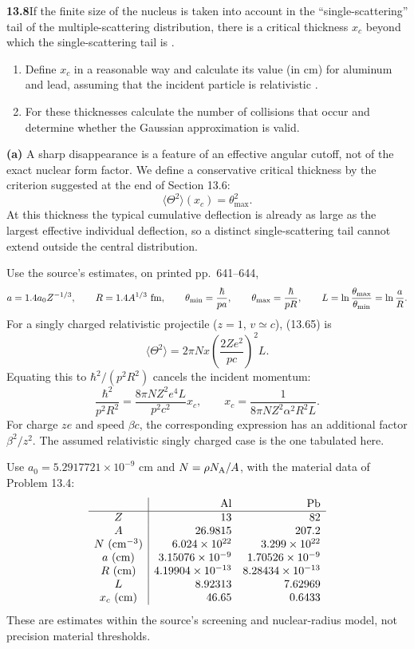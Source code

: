 \par\bigskip
\noindent\textbf{13.8}\quad If the finite size of the nucleus is taken into account in the ``single-scattering'' tail of the multiple-scattering distribution, there is a critical thickness $x_{c}$ beyond which the single-scattering tail is .
\begin{enumerate}
\item[(a)] Define $x_{c}$ in a reasonable way and calculate its value (in cm) for aluminum and lead, assuming that the incident particle is relativistic .
\item[(b)] For these thicknesses calculate the number of collisions that occur and determine whether the Gaussian approximation is valid.
\end{enumerate}
\solution
\textbf{(a)} A sharp disappearance is a feature of an effective
angular cutoff, not of the exact nuclear form factor. We define a
conservative critical thickness by the criterion suggested at the end
of Section 13.6:
\[
 \boxed{\langle\Theta^2\rangle(x_c)=\theta_{\max}^2.}
\]
At this thickness the typical cumulative deflection is already as large
as the largest effective individual deflection, so a distinct
single-scattering tail cannot extend outside the central distribution.

Use the source's estimates, on printed pp.~641--644,
\[
 a=1.4a_0Z^{-1/3},\qquad R=1.4A^{1/3}\ {\rm fm},\qquad
 \theta_{\min}=\frac{\hbar}{pa},\qquad
 \theta_{\max}=\frac{\hbar}{pR},\qquad
 L=\ln\frac{\theta_{\max}}{\theta_{\min}}=\ln\frac aR.
\]
For a singly charged relativistic projectile ($z=1$, $v\simeq c$),
(13.65) is
\[
 \langle\Theta^2\rangle
 =2\pi Nx\left(\frac{2Ze^2}{pc}\right)^2L.
\]
Equating this to $\hbar^2/(p^2R^2)$ cancels the incident momentum:
\[
 \frac{\hbar^2}{p^2R^2}
 =\frac{8\pi NZ^2e^4L}{p^2c^2}x_c,
 \qquad
 \boxed{x_c=\frac{1}{8\pi NZ^2\alpha^2R^2L}.}
\]
For charge $ze$ and speed $\beta c$, the corresponding expression has
an additional factor $\beta^2/z^2$. The assumed relativistic singly
charged case is the one tabulated here.

Use $a_0=5.2917721\times10^{-9}$ cm and
$N=\rho N_{\rm A}/A$, with the material data of Problem 13.4:
\[
\begin{array}{c|rr}
 &\text{Al}&\text{Pb}\\ \hline
 Z&13&82\\
 A&26.9815&207.2\\
 N\ ({\rm cm^{-3}})&6.024\times10^{22}&3.299\times10^{22}\\
 a\ ({\rm cm})&3.15076\times10^{-9}&1.70526\times10^{-9}\\
 R\ ({\rm cm})&4.19904\times10^{-13}&8.28434\times10^{-13}\\
 L&8.92313&7.62969\\
 x_c\ ({\rm cm})&46.65&0.6433
\end{array}
\]
These are estimates within the source's screening and nuclear-radius
model, not precision material thresholds.

